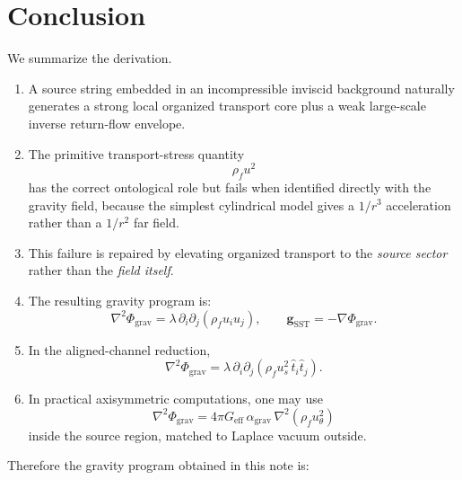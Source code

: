\documentclass[11pt]{article}
\newcommand{\rhoF}{\rho_{\!f}}
\newcommand{\eff}{\mathrm{eff}}
\newcommand{\SST}{\mathrm{SST}}
\newcommand{\grav}{\mathrm{grav}}
\begin{document}
        \section{Conclusion}
        
        We summarize the derivation.
        
        \begin{enumerate}[leftmargin=1.5cm]
\item A source string embedded in an incompressible inviscid background naturally generates a strong local organized transport core plus a weak large-scale inverse return-flow envelope.

\item The primitive transport-stress quantity
\[
    \rhoF u^2
\]
has the correct ontological role but fails when identified directly with the gravity field, because the simplest cylindrical model gives a \(1/r^3\) acceleration rather than a \(1/r^2\) far field.

\item This failure is repaired by elevating organized transport to the \emph{source sector} rather than the \emph{field itself}.

\item The resulting gravity program is:
\begin{equation}
    \boxed{
        \nabla^2 \Phi_{\grav}
        =
        \lambda\,\partial_i\partial_j(\rhoF u_i u_j),
        \qquad
        \mathbf{g}_{\SST}=-\nabla\Phi_{\grav}.
    }
\end{equation}

\item In the aligned-channel reduction,
\begin{equation}
    \boxed{
        \nabla^2 \Phi_{\grav}
        =
        \lambda\,\partial_i\partial_j
        \left(
            \rhoF u_s^2\,\hat t_i \hat t_j
        \right).
    }
\end{equation}

\item In practical axisymmetric computations, one may use
\begin{equation}
    \boxed{
        \nabla^2 \Phi_{\grav}
        =
        4\pi G_{\eff}\,\alpha_{\grav}\,\nabla^2(\rhoF u_\theta^2)
    }
\end{equation}
inside the source region, matched to Laplace vacuum outside.
        \end{enumerate}
        
        Therefore the gravity program obtained in this note is:
        
\end{document}
